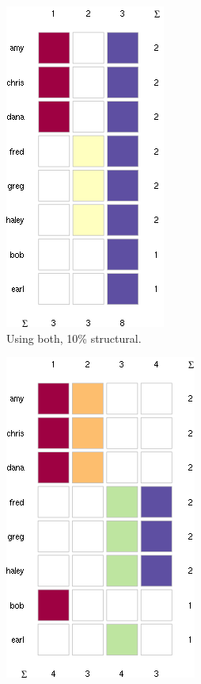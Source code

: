\documentclass{report} %
\begin{document}
\begin{figure}[htp!]
  \centering
  \begin{subfigure}{.4\textwidth}
    \centering
    \includegraphics[width=.6\linewidth]{toy2/ea/top20_0.1.png}
    \caption{Using both, 10\% structural.}
    \label{fig:net1_member_struct}
  \end{subfigure}%
  \begin{subfigure}{.6\textwidth}
    \centering
    \includegraphics[width=.6\linewidth]{toy2/ea/top20_0.25.png}

\end{subfigure}
\end{figure}
\end{document}
